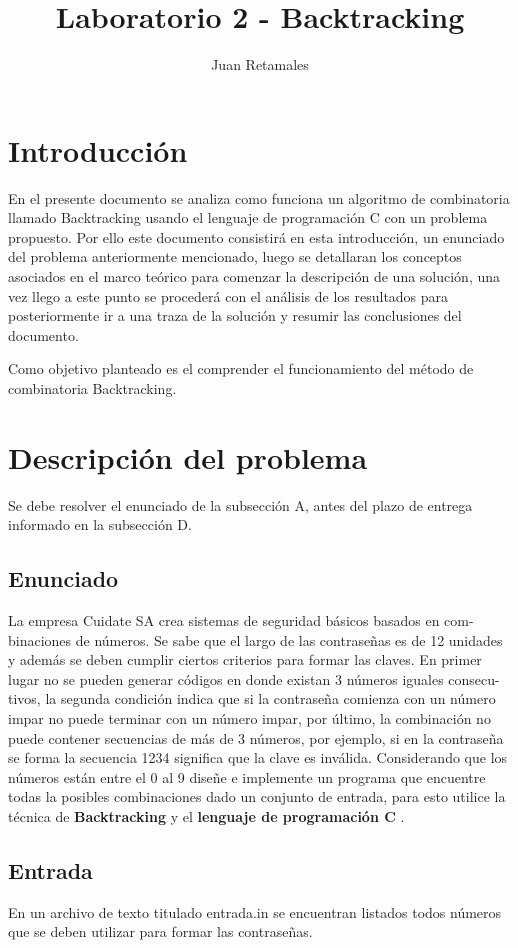 \documentclass[9pt,twocolumn,twoside]{optica}
\title{Laboratorio 2 - Backtracking}
\author{Juan Retamales}
\affil{Profesora: Mónica Villanueva}
\affil{Ayudante: Patricio Vargas}
\begin{document}
\maketitle

\section{Introducción}{
	\par{En}
    el presente documento se analiza como funciona un algoritmo de combinatoria llamado Backtracking usando el lenguaje de programación C con un problema propuesto.
Por ello este documento consistirá en esta introducción, un enunciado del problema anteriormente mencionado, luego se detallaran los conceptos asociados en el marco teórico para comenzar la descripción de una solución, una vez llego a este punto se procederá con el análisis de los resultados para posteriormente ir a una traza de la solución y resumir las conclusiones del documento.

Como objetivo planteado es el comprender el funcionamiento del método de combinatoria Backtracking.
}

\section{Descripción del problema}
Se debe resolver el enunciado de la subsección A, antes del plazo de entrega informado en la subsección D.
\subsection{Enunciado}
La empresa
Cuidate SA
crea sistemas de seguridad básicos basados en com-
binaciones de números. Se sabe que el largo de las contraseñas es de 12 unidades
y además se deben cumplir ciertos criterios para formar las claves. En primer
lugar no se pueden generar códigos en donde existan 3 números iguales consecu-
tivos, la segunda condición indica que si la contraseña comienza con un número
impar no puede terminar con un número impar, por último, la combinación no
puede contener secuencias de más de 3 números, por ejemplo, si en la contraseña
se forma la secuencia 1234 significa que la clave es inválida. Considerando que
los números están entre el 0 al 9 diseñe e implemente un programa que encuentre
todas la posibles combinaciones dado un conjunto de entrada, para esto utilice
la técnica de \textbf{Backtracking} y el \textbf{lenguaje de programación C} \cite{actividad}.

\subsection{Entrada}
En un archivo de texto titulado
entrada.in
se encuentran listados todos
números que se deben utilizar para formar las contraseñas.
\end{document}
